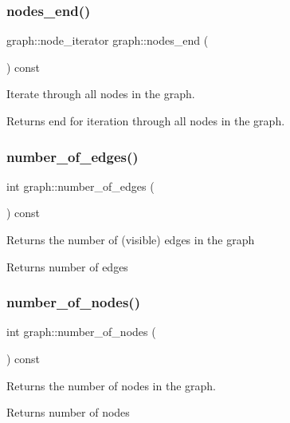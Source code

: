 \subsubsection{\texorpdfstring{nodes\+\_\+end()}{nodes\_end()}}
{\footnotesize\ttfamily graph\+::node\+\_\+iterator graph\+::nodes\+\_\+end (\begin{DoxyParamCaption}{ }\end{DoxyParamCaption}) const}

Iterate through all nodes in the graph.

\begin{DoxyReturn}{Returns}
end for iteration through all nodes in the graph. 
\end{DoxyReturn}
\mbox{\label{classgraph_aa4fcbe7bf572dc800068873ccfb4d95a}} 
\subsubsection{\texorpdfstring{number\+\_\+of\+\_\+edges()}{number\_of\_edges()}}
{\footnotesize\ttfamily int graph\+::number\+\_\+of\+\_\+edges (\begin{DoxyParamCaption}{ }\end{DoxyParamCaption}) const}

Returns the number of (visible) edges in the graph

\begin{DoxyReturn}{Returns}
number of edges 
\end{DoxyReturn}
\mbox{\label{classgraph_a42c78e0a9f115655e3ff0efe35ebfc4e}} 
\subsubsection{\texorpdfstring{number\+\_\+of\+\_\+nodes()}{number\_of\_nodes()}}
{\footnotesize\ttfamily int graph\+::number\+\_\+of\+\_\+nodes (\begin{DoxyParamCaption}{ }\end{DoxyParamCaption}) const}

Returns the number of nodes in the graph.

\begin{DoxyReturn}{Returns}
number of nodes 
\end{DoxyReturn}
\mbox{\label{classgraph_a870633528590b7925cd27776bdd2bbd2}} 
